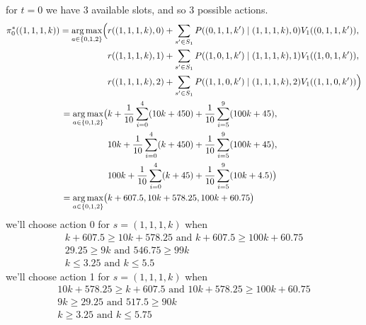 \documentclass{assignmeownt}
\DeclareMathOperator*{\argmax}{arg\,max}
\begin{document}
\begin{enumerate}
for $t=0$ we have 3 available slots, and so 3 possible actions.
\begin{equation}
    \begin{aligned}
        \pi^*_0((1, 1, 1, k)) = \argmax_{a \in \{0,1,2\}} \Bigl(
        &r((1, 1, 1, k), 0) + \sum_{s' \in S_1} P((0, 1, 1, k') \mid (1, 1, 1, k), 0) V_1((0, 1, 1, k')) , \\
        &r((1, 1, 1, k), 1) + \sum_{s' \in S_1} P((1, 0, 1, k') \mid (1, 1, 1, k), 1) V_1((1, 0, 1, k')) , \\
        &r((1, 1, 1, k), 2) + \sum_{s' \in S_1} P((1, 1, 0, k') \mid (1, 1, 1, k), 2) V_1((1, 1, 0, k'))
        \Bigr) \\ 
        = \argmax_{a \in \{0,1,2\}} \bigl(
        &k + \frac{1}{10} \sum_{i=0}^{4} (10k + 450) + \frac{1}{10} \sum_{i=5}^{9} (100k + 45), \\
        &10k + \frac{1}{10} \sum_{i=0}^{4} (k + 450) + \frac{1}{10} \sum_{i=5}^{9} (100k + 45), \\
        &100k + \frac{1}{10} \sum_{i=0}^{4} (k + 45) + \frac{1}{10} \sum_{i=5}^{9} (10k + 4.5)
        \bigr) \\
        = \argmax_{a \in \{0,1,2\}} \bigl( 
        &k + 607.5, 10k + 578.25, 100k + 60.75
        \bigr) \\
    \end{aligned}
\end{equation}
\newline
we'll choose action 0 for $s=(1, 1, 1, k)$ when
\newline
\begin{equation}
    \begin{array}{cc}
        k + 607.5 \geq 10k + 578.25 \text{ and } k + 607.5 \geq 100k + 60.75 \\
        29.25 \geq 9k \text{ and } 546.75 \geq 99k \\
        k \leq 3.25 \text{ and } k \leq 5.5
    \end{array}
\end{equation}
\newline
we'll choose action 1 for $s=(1, 1, 1, k)$ when
\newline
\begin{equation}
    \begin{array}{cc}
        10k + 578.25 \geq k + 607.5 \text{ and } 10k + 578.25 \geq 100k + 60.75 \\
        9k \geq 29.25 \text{ and } 517.5 \geq 90k \\
        k \geq 3.25 \text{ and } k \leq 5.75
    \end{array}
\end{equation}


\end{enumerate}
\end{document}
